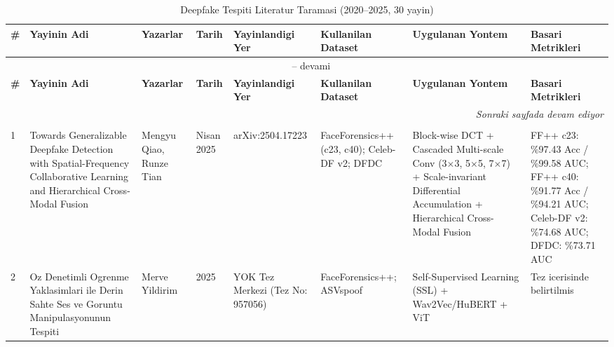 %

\begin{landscape}
\footnotesize
\renewcommand{\arraystretch}{1.25}

\begin{longtable}{@{}p{0.5cm} p{4.2cm} p{3.0cm} p{1.6cm} p{3.0cm} p{3.0cm} p{4.2cm} p{3.5cm}@{}}
\caption{Deepfake Tespiti Literatur Taramasi (2020--2025, 30 yayin)} \label{tab:lit-review} \\
\toprule
\textbf{\#} & \textbf{Yayinin Adi} & \textbf{Yazarlar} & \textbf{Tarih} & \textbf{Yayinlandigi Yer} & \textbf{Kullanilan Dataset} & \textbf{Uygulanan Yontem} & \textbf{Basari Metrikleri} \\
\midrule
\endfirsthead

\multicolumn{8}{c}{\tablename\ \thetable{} -- devami} \\
\toprule
\textbf{\#} & \textbf{Yayinin Adi} & \textbf{Yazarlar} & \textbf{Tarih} & \textbf{Yayinlandigi Yer} & \textbf{Kullanilan Dataset} & \textbf{Uygulanan Yontem} & \textbf{Basari Metrikleri} \\
\midrule
\endhead

\midrule \multicolumn{8}{r}{\textit{Sonraki sayfada devam ediyor}} \\
\endfoot

\bottomrule
\endlastfoot

\multicolumn{8}{l}{\textbf{Kategori 1: Cekirdek (Ana Referans) Calismalar}} \\
\midrule
1 & Towards Generalizable Deepfake Detection with Spatial-Frequency Collaborative Learning and Hierarchical Cross-Modal Fusion & Mengyu Qiao, Runze Tian & Nisan 2025 & arXiv:2504.17223 & FaceForensics++ (c23, c40); Celeb-DF v2; DFDC & Block-wise DCT + Cascaded Multi-scale Conv (3$\times$3, 5$\times$5, 7$\times$7) + Scale-invariant Differential Accumulation + Hierarchical Cross-Modal Fusion & FF++ c23: \%97.43 Acc / \%99.58 AUC; FF++ c40: \%91.77 Acc / \%94.21 AUC; Celeb-DF v2: \%74.68 AUC; DFDC: \%73.71 AUC \\
\midrule
2 & Oz Denetimli Ogrenme Yaklasimlari ile Derin Sahte Ses ve Goruntu Manipulasyonunun Tespiti & Merve Yildirim & 2025 & YOK Tez Merkezi (Tez No: 957056) & FaceForensics++; ASVspoof & Self-Supervised Learning (SSL) + Wav2Vec/HuBERT + ViT & Tez icerisinde belirtilmis \\
\midrule


\end{longtable}
\end{landscape}
